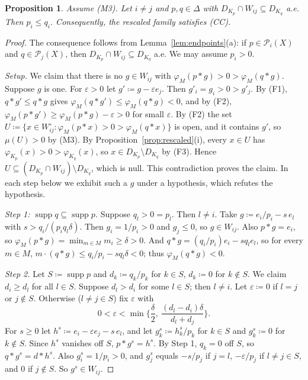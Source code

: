 \documentclass[11pt]{article}
\newtheorem{proposition}[theorem]{Proposition}
\theoremstyle{definition}
\newcommand{\supp}{\operatorname{supp}}
\newcommand{\Pc}{\mathcal P}
\begin{document}
\begin{proposition}\label{prop:cc}
Assume (M3). Let $i\ne j$ and $p,q\in\Delta$ with $D_{K_p}\cap W_{ij}\subseteq D_{K_q}$ a.e. Then $p_i\le q_i$. Consequently, the rescaled family satisfies (CC).
\end{proposition}

\begin{proof}
The consequence follows from Lemma~\ref{lem:endpoints}(a): if $p\in\Pc_i(X)$ and $q\in\Pc_j(X)$, then $D_{K_p}\cap W_{ij}\subseteq D_{K_q}$ a.e. We may assume $p_i>0$.

\emph{Setup.} We claim that there is no $g\in W_{ij}$ with $\varphi_M(p*g)>0>\varphi_M(q*g)$. Suppose $g$ is one. For $\varepsilon>0$ let $g'\coloneqq g-\varepsilon e_j$. Then $g'_i=g_i>0>g'_j$. By (F1), $q*g'\le q*g$ gives $\varphi_M(q*g')\le\varphi_M(q*g)<0$, and by (F2), $\varphi_M(p*g')\ge\varphi_M(p*g)-\varepsilon>0$ for small $\varepsilon$. By (F2) the set $U\coloneqq\{x\in W^\circ_{ij}:\varphi_M(p*x)>0>\varphi_M(q*x)\}$ is open, and it contains $g'$, so $\mu(U)>0$ by (M3). By Proposition~\ref{prop:rescaled}(i), every $x\in U$ has $\varphi_{K_p}(x)>0>\varphi_{K_q}(x)$, so $x\in D_{K_p}\setminus D_{K_q}$ by (F3). Hence $U\subseteq(D_{K_p}\cap W_{ij})\setminus D_{K_q}$, which is null. This contradiction proves the claim. In each step below we exhibit such a $g$ under a hypothesis, which refutes the hypothesis.

\emph{Step 1: $\supp q\subseteq\supp p$.} Suppose $q_l>0=p_l$. Then $l\ne i$. Take $g\coloneqq e_i/p_i-s\,e_l$ with $s>q_i/(p_iq_l\delta)$. Then $g_i=1/p_i>0$ and $g_j\le0$, so $g\in W_{ij}$. Also $p*g=e_i$, so $\varphi_M(p*g)=\min_{m\in M}m_i\ge\delta>0$. And $q*g=(q_i/p_i)e_i-sq_le_l$, so for every $m\in M$, $m\cdot(q*g)\le q_i/p_i-sq_l\delta<0$; thus $\varphi_M(q*g)<0$.

\emph{Step 2.} Let $S\coloneqq\supp p$ and $d_k\coloneqq q_k/p_k$ for $k\in S$, $d_k\coloneqq0$ for $k\notin S$. We claim $d_i\ge d_l$ for all $l\in S$. Suppose $d_l>d_i$ for some $l\in S$; then $l\ne i$. Let $\varepsilon\coloneqq0$ if $l=j$ or $j\notin S$. Otherwise ($l\ne j\in S$) fix $\varepsilon$ with
\[
0<\varepsilon<\min\Big\{\frac\delta2,\ \frac{(d_l-d_i)\delta}{d_l+d_j}\Big\}.
\]
For $s\ge0$ let $h^s\coloneqq e_i-\varepsilon e_j-s\,e_l$, and let $g^s_k\coloneqq h^s_k/p_k$ for $k\in S$ and $g^s_k\coloneqq0$ for $k\notin S$. Since $h^s$ vanishes off $S$, $p*g^s=h^s$. By Step 1, $q_k=0$ off $S$, so $q*g^s=d*h^s$. Also $g^s_i=1/p_i>0$, and $g^s_j$ equals $-s/p_j$ if $j=l$, $-\varepsilon/p_j$ if $l\ne j\in S$, and $0$ if $j\notin S$. So $g^s\in W_{ij}$.


\end{proof}
\end{document}
